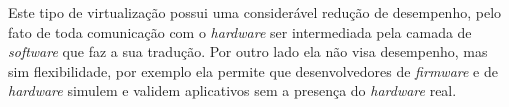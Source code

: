 Este tipo de virtualização possui uma considerável redução de desempenho, pelo fato de toda comunicação com o \textit{hardware}
ser intermediada pela camada de \textit{software} que faz a sua tradução. Por outro lado ela não visa desempenho, mas sim flexibilidade,
por exemplo ela permite que desenvolvedores de \textit{firmware} e de \textit{hardware} simulem e validem aplicativos sem a presença
do \textit{hardware} real.



